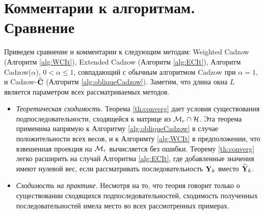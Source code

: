 \documentclass[12pt, specialist, subf,href,colorlinks=true,substylefile = spbu.rtx]{disser}
\theoremstyle{remark}
\theoremstyle{definition}
\begin{document}
\section{Комментарии к алгоритмам. Сравнение}
\label{sec:comments}
Приведем сравнение и комментарии к следующим методам: Weighted Cadzow (Алгоритм \ref{alg:WCIt}), Extended Cadzow (Алгоритм \ref{alg:ECIt}), Алгоритм Cadzow($\alpha$), $0< \alpha \leq 1$, совпадающий с обычным алгоритмом Cadzow при $\alpha=1$,
и Cadzow-$\widehat{\mathbf{C}}$ (Алгоритм \ref{alg:obliqueCadzow}).
Заметим, что длина окна $L$ является параметром всех рассматриваемых методов.

\begin{itemize}
	\item \textit{Теоретическая сходимость.}
	Теорема \ref{th:converg} дает условия существования подпоследовательности, сходящейся к матрице из $\mathcal{M}_r \cap \mathcal{H}$. Эта теорема применима напрямую к Алгоритму \ref{alg:obliqueCadzow} в случае положительности всех весов, и к Алгоримту \ref{alg:WCIt} в предположении, что взвешенная проекция на $\mathcal{M}_r$ вычисляется без ошибки. Теорему \ref{th:converg} легко расширить на случай Алгоритма \ref{alg:ECIt}, где добавленные значения имеют нулевой вес, если рассматривать последовательность $\mathbf{Y}_k$ вместо $\widetilde{\mathbf{Y}}_k$.

	\item \textit{Сходимость на практике.} Несмотря на то, что теория говорит только о существовании сходящихся подпоследовательностей, сходимость полученных последовательностей имела место во всех рассмотренных примерах.
	

\end{itemize}
\end{document}
